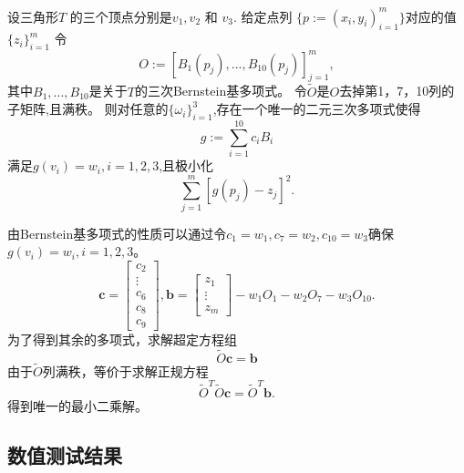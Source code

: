 \begin{lem}
  设三角形$T$ 的三个顶点分别是$v_1,v_2$ 和 $v_3$.
 给定点列 $\{p:=(x_i,y_i)^m_{i=1}\}$对应的值 $\{z_i\}^m_{i=1}$
 令
  \begin{displaymath}
    O:=[B_1(p_j),...,B_{10}(p_j)]_{j=1}^m,
  \end{displaymath}
  其中$B_1,...,B_{10}$是关于$T$的三次Bernstein基多项式。
  令$\tilde{O}$是$O$去掉第1，7，10列的子矩阵,且满秩。
  则对任意的$\{\omega_i\}_{i=1}^3$,存在一个唯一的二元三次多项式使得
  \begin{displaymath}
    g:=\sum_{i=1}^{10}c_iB_i
  \end{displaymath}
  满足$g(v_i)=w_i,i=1,2,3$,且极小化
  \begin{displaymath}
    \sum_{j=1}^m[g(p_j)-z_j]^2.
  \end{displaymath}
\end{lem}

\begin{pro}
  由Bernstein基多项式的性质可以通过令$c_1 = w_1, c_7 = w_2, c_{10} = w_3$确保$g(v_i)=w_i,i=1,2,3$。
  \begin{displaymath}
    \boldsymbol{c} = \left[
      \begin{matrix}
        c_2\\
        \vdots\\
        c_6\\
        c_8\\
        c_9
      \end{matrix}
    \right], 
    \boldsymbol{b} = \left[
      \begin{matrix}
        z_1\\
        \vdots\\
        z_m
      \end{matrix}
    \right] - w_1O_1-w_2O_7-w_3O_{10}.      
  \end{displaymath}
  为了得到其余的多项式，求解超定方程组
  \begin{displaymath}
    \tilde{O}\boldsymbol{c} = \boldsymbol{b}
  \end{displaymath}
  由于$\tilde{O}$列满秩，等价于求解正规方程
  \begin{displaymath}
    \tilde{O}^T\tilde{O}\boldsymbol{c} = \tilde{O}^T\boldsymbol{b}.
  \end{displaymath}
  得到唯一的最小二乘解。
\end{pro}

\subsection{数值测试结果}

